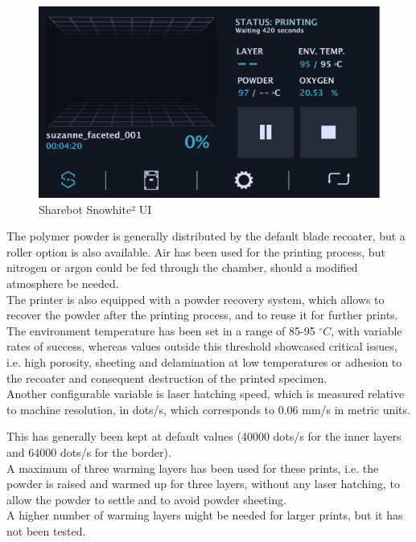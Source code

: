 \documentclass[a4paper]{article}
\begin{document}
          \begin{figure}[ht]
              \centering
              \includegraphics[width=\textwidth]{Pictures/Sharebot_GUI.pdf}
              \caption{Sharebot Snowhite² UI}
              \label{fig:Sharebot_UI}
          \end{figure}
  
          The polymer powder is generally distributed by the default blade recoater, but a roller option is also available. 
          Air has been used for the printing process, but nitrogen or argon could be fed through the chamber, 
          should a modified atmosphere be needed.  \\
  
          The printer is also equipped with a powder recovery system, which allows to recover the powder 
          after the printing process, and to reuse it for further prints. \\ 
  
          The environment temperature has been set in a range of 85-95 $^{\circ}C$, with variable rates of success, 
          whereas values outside this threshold showcased critical issues, i.e. high porosity, sheeting and 
          delamination at low temperatures or adhesion to the recoater and consequent destruction of the printed specimen. \\ 
  
          Another configurable variable is laser hatching speed, which is measured relative to machine resolution, in dots/s, 
          which corresponds to 0.06 mm/s in metric units. 
  
          This has generally been kept at default values (40000 dots/s for the inner layers and 64000 dots/s for the border).  \\ 
  
          A maximum of three warming layers has been used for these prints, i.e. the powder is raised and warmed 
          up for three layers, without any laser hatching, to allow the powder to settle and to avoid 
          powder sheeting. \\ 
          A higher number of warming layers might be needed for larger prints, but it has not been tested. \\
  
\end{document}
